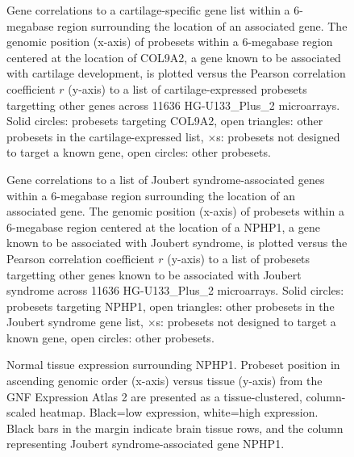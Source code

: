 \documentclass{bioinfo}
\begin{document}

\begin{figure}[!tpb]
\label{figure:COL9A2}
\centerline{}
\caption{Gene correlations to a cartilage-specific gene list within a 6-megabase region
surrounding the location of an associated gene.  The genomic position (x-axis)
of probesets within a 6-megabase region centered at the location of COL9A2, a
gene known to be associated with cartilage development, is plotted versus the
Pearson correlation coefficient $r$ (y-axis) to a list of cartilage-expressed
probesets targetting other genes across 11636 HG-U133\_Plus\_2 microarrays.
Solid circles: probesets targeting COL9A2, open triangles: other probesets in
the cartilage-expressed list, $\times$s: probesets not designed to target a
known gene, open circles: other probesets.}
\end{figure}


\begin{figure}[!tpb]
\label{figure:NPHP1}
\centerline{}
\caption{Gene correlations to a list of Joubert syndrome-associated genes within a
6-megabase region surrounding the location of an associated gene.  The genomic
position (x-axis) of probesets within a 6-megabase region centered at the
location of a NPHP1, a gene known to be associated with Joubert syndrome, is
plotted versus the Pearson correlation coefficient $r$ (y-axis) to a list of
probesets targetting other genes known to be associated with Joubert syndrome
across 11636 HG-U133\_Plus\_2 microarrays.  Solid circles: probesets targeting
NPHP1, open triangles: other probesets in the Joubert syndrome gene list,
$\times$s: probesets not designed to target a known gene, open circles: other
probesets.}
\end{figure}


\begin{figure}[!tpb]
\label{figure:GeneAtlas}
\centerline{}
\caption{Normal tissue expression surrounding NPHP1.  Probeset position in
ascending genomic order (x-axis) versus tissue (y-axis) from the GNF Expression
Atlas 2 are presented as a tissue-clustered, column-scaled heatmap.  Black=low
expression, white=high expression.  Black bars in the margin indicate brain
tissue rows, and the column representing Joubert syndrome-associated gene
NPHP1.}
\end{figure}
\end{document}
